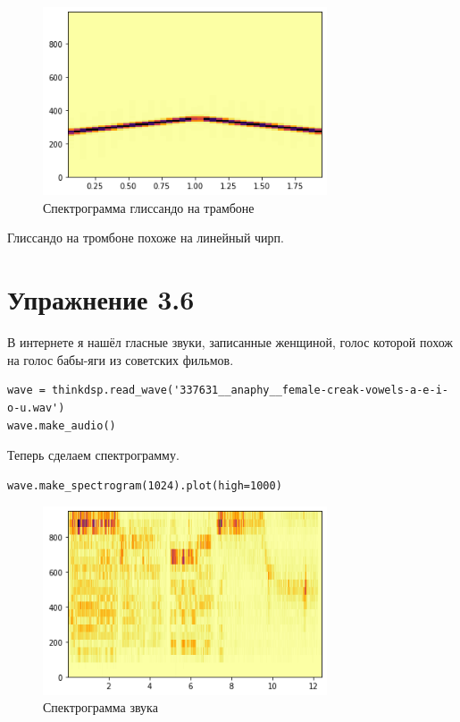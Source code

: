 \documentclass[a4paper,12pt]{report}
\begin{document}
\begin{figure}[H]
        \centering
        \includegraphics[width=0.75\textwidth]{lab3_fig5_1.png}
        \caption{Спектрограмма глиссандо на трамбоне}
        \label{fig:lab3_fig5_1}
\end{figure}

Глиссандо на тромбоне похоже на линейный чирп.

\chapter{Упражнение 3.6}

В интернете я нашёл гласные звуки, записанные женщиной, голос которой похож на голос бабы-яги из советских фильмов.

\begin{lstlisting}[caption=Загрузка и прослушивание звука]
wave = thinkdsp.read_wave('337631__anaphy__female-creak-vowels-a-e-i-o-u.wav')
wave.make_audio()
\end{lstlisting}

Теперь сделаем спектрограмму.

\begin{lstlisting}[caption=Создание спектрограммы]
wave.make_spectrogram(1024).plot(high=1000)
\end{lstlisting}

\begin{figure}[H]
        \centering
        \includegraphics[width=0.75\textwidth]{lab3_fig6_1.png}
        \caption{Спектрограмма звука}
        \label{fig:lab3_fig6_1}
\end{figure}
\end{document}
